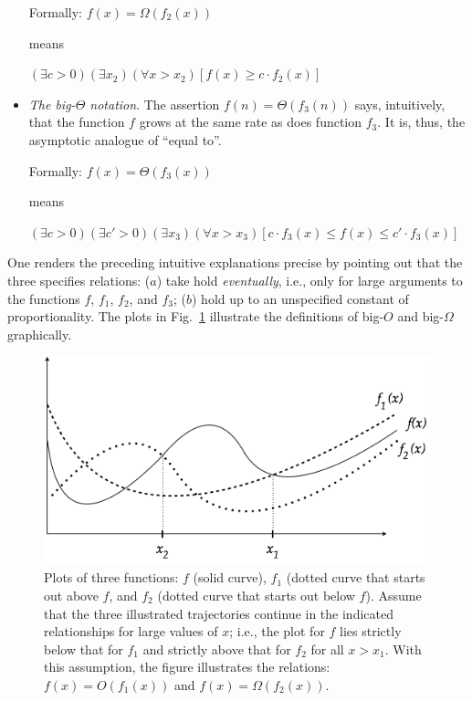 \begin{itemize}
Formally:
$f(x) = \Omega(f_2(x))$

means

$(\exists c >0)(\exists x_2)(\forall x > x_2)
[f(x) \geq c \cdot  f_2(x)]$

\item
{\em The big-$\Theta$ notation}.
%
The assertion $f(n) = \Theta(f_3(n))$ says, intuitively, that the
function $f$ grows at the same rate as does function $f_3$.  It is,
thus, the asymptotic analogue of ``equal to''.

Formally:
$f(x) = \Theta(f_3(x))$

means

$(\exists c >0)(\exists c' >0)(\exists x_{3})(\forall x > x_{3})
[c \cdot f_3(x) \leq f(x) \leq c' \cdot  f_3(x)]$
\end{itemize}
One renders the preceding intuitive explanations precise by pointing
out that the three specifies relations: ($a$) take hold {\em
  eventually}, i.e., only for large arguments to the functions $f$,
$f_1$, $f_2$, and $f_3$; ($b$) hold up to an unspecified constant of
proportionality.  The plots in Fig.~\ref{fig:Asymptotic} illustrate
the definitions of big-$O$ and big-$\Omega$ graphically.
\begin{figure}[htb]
\begin{center}
       \includegraphics[scale=0.4]{FiguresArithmetic/NotationAsymptotic}
\caption{Plots of three functions: $f$ (solid curve), $f_1$ (dotted
  curve that starts out above $f$, and $f_2$ (dotted curve that starts
  out below $f$).  Assume that the three illustrated trajectories
  continue in the indicated relationships for large values of $x$;
  i.e., the plot for $f$ lies strictly below that for $f_1$ and strictly
  above that for $f_2$ for all $x > x_1$.  With this assumption, the
  figure illustrates the relations: $f(x) = O(f_1(x))$ and
  $f(x) = \Omega(f_2(x))$.
  }
\label{fig:Asymptotic}
\end{center}
\end{figure}


